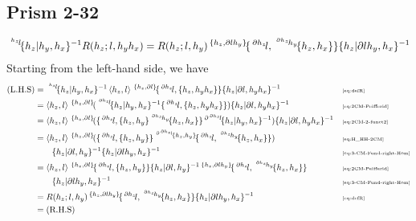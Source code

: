 \documentclass[11pt, reqno]{amsart} %
\newcommand{\act}[1]{\,\sp{#1}\!}
\theoremstyle{definition}
\theoremstyle{remark}
\numberwithin{equation}{section}
\begin{document}
\subsection{Prism 2-32}
\begin{align*}
  \act{\act{h_z}l}\{h_z|h_y,h_x\}^{-1}R(h_z;l,h_yh_x) = R(h_z;l,h_y)\act{\{h_z,\partial lh_y\}}\{\act{\partial h_z}l,\act{\act{\partial h_z}h_y}\{h_z,h_x\}\}\{h_z|\partial lh_y,h_x\}^{-1}
\end{align*}
Starting from the left-hand side, we have
\begin{align*}
  \text{(L.H.S)} &= \act{\act{h_z}l}\{h_z|h_y,h_x\}^{-1}\left<h_z,l\right>\act{\{h_z,\partial l\}}\{\act{\partial h_z}l,\{h_z,h_yh_x\}\}\{h_z|\partial l,h_yh_x\}^{-1} & &\text{\tiny \eqref{eq:defR}} \\
  &= \left<h_z,l\right>\act{\{h_z,\partial l\}}(\act{\act{\partial h_z}l}\{h_z|h_y,h_x\}^{-1}\{\act{\partial h_z}l,\{h_z,h_yh_x\}\})\{h_z|\partial l,h_yh_x\}^{-1} & &\text{\tiny \eqref{eq:2CM-Peifferid}} \\
  &= \left<h_z,l\right>\act{\{h_z,\partial l\}}(\{\act{\partial h_z}l,\{h_z,h_y\}\act{\act{\partial h_z}h_y}\{h_z,h_x\}\}\act{\partial\act{\partial h_z}l}\{h_z|h_y,h_x\}^{-1})\{h_z|\partial l,h_yh_x\}^{-1} & &\text{\tiny \eqref{eq:2CM-2-funct2}} \\
  &= \left<h_z,l\right>\act{\{h_z,\partial l\}}(\{\act{\partial h_z}l,\{h_z,h_y\}\}\act{\act{\partial \act{\partial h_z}l}\{h_z,h_y\}}\{\act{\partial h_z}l,\act{\act{\partial h_z}h_y}\{h_z,h_x\}\}) & &\text{\tiny \eqref{eq:H_HH-2CM}} \\
  &\qquad 
  \{h_z|\partial l,h_y\}^{-1}\{h_z|\partial lh_y,h_x\}^{-1} & &\text{\tiny \eqref{eq:3-CM-Fund-right-Hom}} \\
  &= \left<h_z,l\right>\act{\{h_z,\partial l\}}\{\act{\partial h_z}l,\{h_z,h_y\}\}\{h_z|\partial l,h_y\}^{-1}\act{\{h_z,\partial lh_y\}}\{\act{\partial h_z}l,\act{\act{\partial h_z}h_y}\{h_z,h_x\}\} & &\text{\tiny \eqref{eq:2CM-Peifferid}} \\
  &\qquad 
  \{h_z|\partial lh_y,h_x\}^{-1} & &\text{\tiny \eqref{eq:3-CM-Fund-right-Hom}} \\
  &= R(h_z;l,h_y)\act{\{h_z,\partial lh_y\}}\{\act{\partial h_z}l,\act{\act{\partial h_z}h_y}\{h_z,h_x\}\}\{h_z|\partial lh_y,h_x\}^{-1} & &\text{\tiny \eqref{eq:defR}} \\
  &= (\text{R.H.S})
\end{align*}
\end{document}
